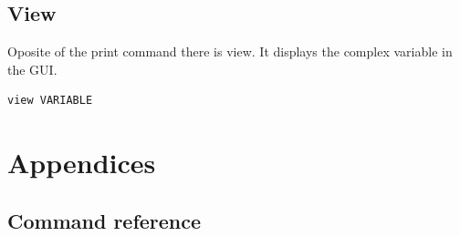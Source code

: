 \documentclass[10pt,a4paper,oneside]{report}
\begin{document}
\section{View}
Oposite of the print command there is view. It displays the complex variable in
the GUI.
\begin{verbatim}
view VARIABLE
\end{verbatim}


\chapter{Appendices}
\section{Command reference}
\end{document}
